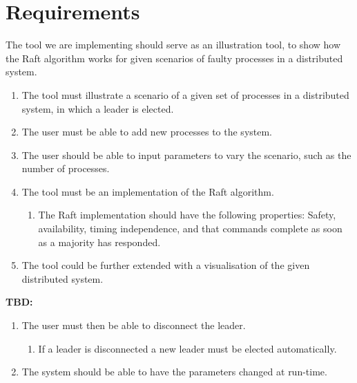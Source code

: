 \section{Requirements}

The tool we are implementing should serve as an illustration tool, to show how the Raft algorithm works for given scenarios of faulty processes in a distributed system.

\begin{enumerate}
\item The tool must illustrate a scenario of a given set of processes in a distributed system, in which a leader is elected.
\item The user must be able to add new processes to the system.
\item The user should be able to input parameters to vary the scenario, such as the number of processes.
\item The tool must be an implementation of the Raft algorithm.
	\begin{enumerate}
	\item The Raft implementation should have the following properties: Safety, availability, timing independence, and that commands complete as soon as a majority has responded. 
	\end{enumerate}
\item The tool could be further extended with a visualisation of the given distributed system.
\end{enumerate}
\textbf{TBD:}
\begin{enumerate}
\item The user must then be able to disconnect the leader.
	\begin{enumerate}
	\item If a leader is disconnected a new leader must be elected automatically.
	\end{enumerate}
\item The system should be able to have the parameters changed at run-time.
\end{enumerate}

